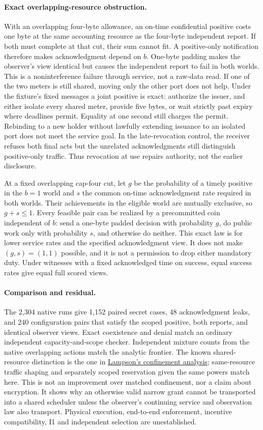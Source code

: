 \documentclass{article}
\begin{document}
\paragraph{Exact overlapping-resource obstruction.}
With an overlapping four-byte allowance, an on-time confidential
positive costs one byte at the same accounting resource as the
four-byte independent report. If both must complete at that cut,
their sum cannot fit. A positive-only notification therefore makes
acknowledgment depend on \(b\). One-byte padding makes the observer's
view identical but causes the independent report to fail in both
worlds. This is a noninterference failure through service, not a
raw-data read. If one of the two meters is still shared, moving
only the other port does not help. Under the fixture's fixed
messages a joint positive is exact: authorize the issuer, and
either isolate every shared meter, provide five bytes, or wait
strictly past expiry where deadlines permit. Equality at one
second still charges the permit. Rebinding to a new holder without
lawfully extending issuance to an isolated port does not meet the
service goal. In the late-revocation control, the receiver refuses
both final acts but the unrelated acknowledgments still distinguish
positive-only traffic. Thus revocation at use repairs authority,
not the earlier disclosure.

At a fixed overlapping cap-four cut, let \(g\) be the probability
of a timely positive in the \(b=1\) world and \(s\) the common
on-time acknowledgment rate required in both worlds. Their
achievements in the eligible world are mutually exclusive, so
\(g+s\le1\). Every feasible pair can be realized by a precommitted
coin independent of \(b\): send a one-byte padded decision with
probability \(g\), do public work only with probability \(s\), and
otherwise do neither. This exact law is for lower service rates
and the specified acknowledgment view. It does not make
\((g,s)=(1,1)\) possible, and it is not a permission to drop
either mandatory duty. Under witnesses with a fixed acknowledged
time on success, equal success rates give equal full scored views.

\paragraph{Comparison and residual.}
The 2,304 native runs give 1,152 paired secret cases, 48 acknowledgment
leaks, and 240 configuration pairs that satisfy the scoped positive,
both reports, and identical observer views. Exact coexistence
and denial match an ordinary independent capacity-and-scope
checker. Independent mixture counts from the native overlapping
actions match the analytic frontier. The known shared-resource
distinction is the one in
\href{https://www.microsoft.com/en-us/research/wp-content/uploads/2016/02/acrobat-24.pdf}{Lampson's confinement analysis};
same-resource traffic shaping and separately scoped reservation
given the same powers match here. This is not an improvement
over matched confinement, nor a claim about encryption.
It shows why an otherwise valid narrow grant cannot be
transported into a shared scheduler unless the observer's
continuing service and observation law also transport.
Physical execution, end-to-end enforcement, incentive
compatibility, I1 and independent selection are unestablished.
\end{document}
